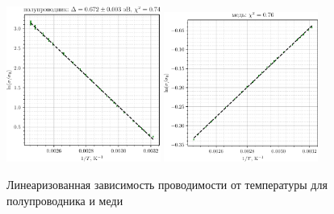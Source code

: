 \begin{figure}[h]
    \centering
    \includegraphics[width=0.45\textwidth]{plot_sc_6.11.1.pdf}
    \hspace{5 mm} 
    \includegraphics[width=0.45\textwidth]{plot_cu_6.11.1.pdf}
    \caption{Линеаризованная зависимость проводимости от температуры для полупроводника и меди}
    \label{fig:sccu}
\end{figure}
